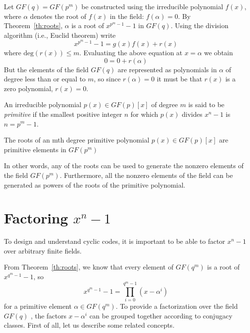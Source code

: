 Let \(GF(q)=GF(p^m) \) be constructed using the irreducible polynomial \(f(x)\), where \(\alpha\) denotes the root of \(f(x)\) in the field: \(f(\alpha)= 0\). By Theorem~\ref{th:roots}, $\alpha$ is a root of \(x^{p^m-1}-1\) in \(GF(q)\). Using the division algorithm (i.e., Euclid theorem) write
\begin{equation}
x^{p^m-1}-1= g(x)f(x)+r(x)
\end{equation}
where \( \mathrm{deg}(r(x)) \le m\). Evaluating the above equation at \(x=\alpha\) we obtain
\[
0 = 0 + r(\alpha)
\]
But the elements of the field \(GF(q)\) are represented as polynomials in $\alpha$ of degree less than or equal to \(m\), so since \(r(\alpha)= 0\) it must be that \(r(x)\) is a zero polynomial, \(r(x) = 0\).

\begin{Def}
An irreducible polynomial \(p(x) \in GF(p)[x] \) of degree \(m\) is said to be \emph{primitive} if the smallest positive integer \(n\) for which \(p(x)\) divides \(x^n-1\) is \(n=p^m-1\).
\end{Def}

\begin{Theorem}
The roots of an mth degree primitive polynomial \( p(x) \in GF(p)[x] \) are primitive elements in \(GF(p^m)\)
\end{Theorem}
In other words, any of the roots can be used to generate the nonzero elements of the field \(GF(p^m)\). Furthermore, all the nonzero elements of the field can be generated as powers of the roots of the primitive polynomial.

\section{Factoring $x^n-1$ } \label{sec:factoring}

To design and understand cyclic codes, it is important to be able to factor \(x^n-1\) over arbitrary finite fields.

From Theorem~\ref{th:roots}, we know that every element of \(GF(q^m) \) is a root of \(x^{q^m-1}-1\), so \[
x^{q^m-1}-1= \prod_{i=0}^{q^m-1} {(x-\alpha^i)}
\]
for a primitive element \( \alpha \in GF(q^m) \). To provide a factorization over the field \(GF(q)\) , the factors \(x-\alpha^i\) can be grouped together according to conjugacy classes. First of all, let us describe some related concepts.

